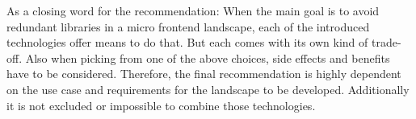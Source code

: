 As a closing word for the recommendation: When the main goal is to avoid redundant libraries in a micro frontend landscape, each of the introduced technologies offer means to do that. But each comes with its own kind of trade-off. Also when picking from one of the above choices, side effects and benefits have to be considered. Therefore, the final recommendation is highly dependent on the use case and requirements for the landscape to be developed.
Additionally it is not excluded or impossible to combine those technologies. 

